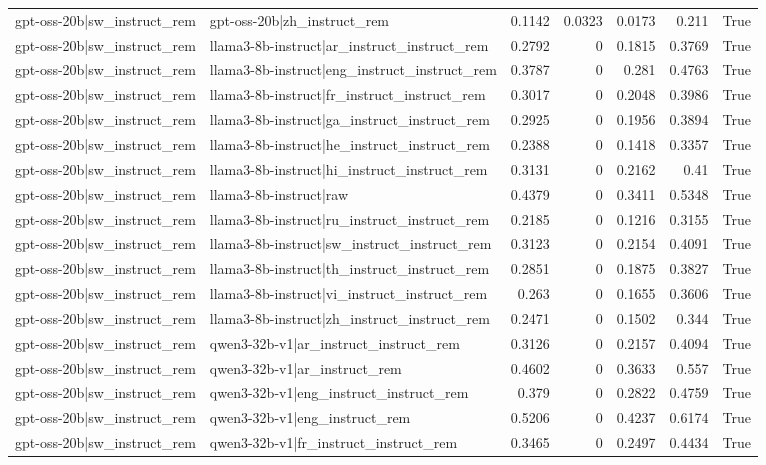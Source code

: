 \begin{table}
\begin{tabular}{l l r r r r l}
gpt-oss-20b|sw_instruct_rem & gpt-oss-20b|zh_instruct_rem & 0.1142 & 0.0323 & 0.0173 & 0.211 & True \\
gpt-oss-20b|sw_instruct_rem & llama3-8b-instruct|ar_instruct_instruct_rem & 0.2792 & 0 & 0.1815 & 0.3769 & True \\
gpt-oss-20b|sw_instruct_rem & llama3-8b-instruct|eng_instruct_instruct_rem & 0.3787 & 0 & 0.281 & 0.4763 & True \\
gpt-oss-20b|sw_instruct_rem & llama3-8b-instruct|fr_instruct_instruct_rem & 0.3017 & 0 & 0.2048 & 0.3986 & True \\
gpt-oss-20b|sw_instruct_rem & llama3-8b-instruct|ga_instruct_instruct_rem & 0.2925 & 0 & 0.1956 & 0.3894 & True \\
gpt-oss-20b|sw_instruct_rem & llama3-8b-instruct|he_instruct_instruct_rem & 0.2388 & 0 & 0.1418 & 0.3357 & True \\
gpt-oss-20b|sw_instruct_rem & llama3-8b-instruct|hi_instruct_instruct_rem & 0.3131 & 0 & 0.2162 & 0.41 & True \\
gpt-oss-20b|sw_instruct_rem & llama3-8b-instruct|raw & 0.4379 & 0 & 0.3411 & 0.5348 & True \\
gpt-oss-20b|sw_instruct_rem & llama3-8b-instruct|ru_instruct_instruct_rem & 0.2185 & 0 & 0.1216 & 0.3155 & True \\
gpt-oss-20b|sw_instruct_rem & llama3-8b-instruct|sw_instruct_instruct_rem & 0.3123 & 0 & 0.2154 & 0.4091 & True \\
gpt-oss-20b|sw_instruct_rem & llama3-8b-instruct|th_instruct_instruct_rem & 0.2851 & 0 & 0.1875 & 0.3827 & True \\
gpt-oss-20b|sw_instruct_rem & llama3-8b-instruct|vi_instruct_instruct_rem & 0.263 & 0 & 0.1655 & 0.3606 & True \\
gpt-oss-20b|sw_instruct_rem & llama3-8b-instruct|zh_instruct_instruct_rem & 0.2471 & 0 & 0.1502 & 0.344 & True \\
gpt-oss-20b|sw_instruct_rem & qwen3-32b-v1|ar_instruct_instruct_rem & 0.3126 & 0 & 0.2157 & 0.4094 & True \\
gpt-oss-20b|sw_instruct_rem & qwen3-32b-v1|ar_instruct_rem & 0.4602 & 0 & 0.3633 & 0.557 & True \\
gpt-oss-20b|sw_instruct_rem & qwen3-32b-v1|eng_instruct_instruct_rem & 0.379 & 0 & 0.2822 & 0.4759 & True \\
gpt-oss-20b|sw_instruct_rem & qwen3-32b-v1|eng_instruct_rem & 0.5206 & 0 & 0.4237 & 0.6174 & True \\
gpt-oss-20b|sw_instruct_rem & qwen3-32b-v1|fr_instruct_instruct_rem & 0.3465 & 0 & 0.2497 & 0.4434 & True \\

\end{tabular}
\end{table}
